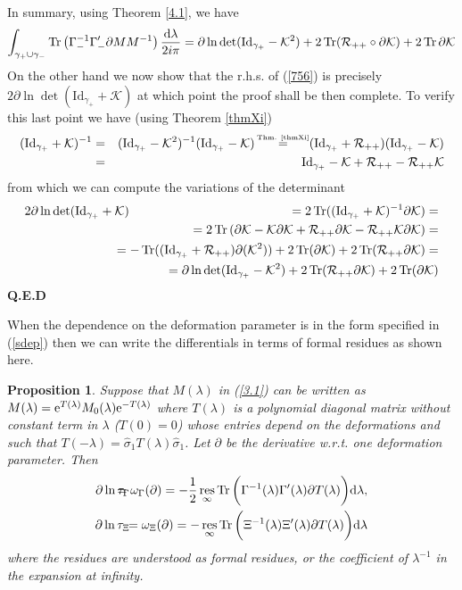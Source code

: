 \documentclass{article}
\newtheorem{prop}{Proposition}[section]
\def\s{\sigma}
\def\&{&\hspace{-20pt}}
\def\d{{\rm d}}
\def\wh{\widehat}
\def \pa{\partial}
\def\bea{\begin{eqnarray}}
\def\eea{\end{eqnarray}}
\def\Id{\mathrm{Id}}
\def\res{\mathop{{\rm res}}}
\def\Tr{\mathop{{\rm Tr}}}
\def\QED{ {\bf Q.E.D}\par \vskip 4pt}
\newcommand{\be}{\begin{eqnarray}}
\newcommand{\ee}{\end{eqnarray}}
\def\le{\left}
\def\ri{\right}
\begin{document}
In summary, using Theorem \ref{4.1}, we have
\be
\int_{\gamma_+  \cup \gamma_-} \Tr \le(\Gamma_{-}^{-1} \Gamma_-' \pa M M^{-1}\ri) \frac {\d \lambda}{2i\pi}  = 
\pa \ln \det( \Id_{\gamma_+} - \mathcal K^2)+
  2 \Tr (\mathcal R_{++} \circ \pa \mathcal K) 
+
 2 \Tr \pa \mathcal K
\label{756} 
\ee
On the other hand we now show that the r.h.s. of (\ref{756}) is precisely $2\pa \ln \det (\Id_{\gamma_+}
+
\mathcal K)$ at which point the proof shall be then complete.
To verify this last point  we have (using Theorem \ref{thmXi})
\bea
(\Id_{\gamma_+} 
 + 
 \mathcal K)^{-1} &=& (\Id_{\gamma_+}-\mathcal K^2)^{-1}(\Id_{\gamma_+}
  - 
 \mathcal K)
 \mathop{=}^{\hbox{\tiny Thm. \ref{thmXi}}} (\Id_{\gamma_+}  +\mathcal R_{++})(\Id_{\gamma_+}
  - 
 \mathcal K) \nonumber\\
&=&\Id_{\gamma_+} 
 - 
 \mathcal K + \mathcal R_{++} 
 - 
 \mathcal R_{++} \mathcal K \label{resolventformula}
\eea
from which we can compute the variations of the determinant
\bea
2\pa \ln \det (\Id_{\gamma_+} 
 + 
 \mathcal K) &\& =
 2
  \Tr ( (\Id_{\gamma_+} 
  + 
  \mathcal K)^{-1} \pa \mathcal K)=\nonumber\\
&\& =
2\Tr \le(
\pa \mathcal K  - \mathcal K \pa \mathcal K +  \mathcal R_{++} \pa \mathcal K    - 
  \mathcal R_{++}  \mathcal K \pa \mathcal K
\ri) =\nonumber\\
&\&=- \Tr ((\Id_{\gamma_+} +\mathcal R_{++} )\pa (\mathcal K^2)) 
 + 
 2\Tr (\pa \mathcal K) 
  + 
 2 \Tr ( \mathcal R_{++}\pa \mathcal K)=\nonumber\\
&\& = \pa \ln \det (\Id_{\gamma_+} - \mathcal K^2) 
 + 
2 \Tr ( \mathcal R_{++}\pa \mathcal K)
+
2\Tr (\pa \mathcal K) 
\eea
\QED
 




When the dependence on the deformation parameter is in the form specified in (\ref{sdep}) then we can write the differentials in terms of formal residues as shown here.
\begin{prop}
\label{formalres}
Suppose that $M(\lambda)$ in (\ref{3.1}) can be written as  $M(\lambda) = {\rm e}^{T(\lambda)} M_0(\lambda) {\rm e}^{-T(\lambda)}$ where $T(\lambda)$ is a polynomial diagonal matrix without constant term in $\lambda$ ($T(0)=0$) whose entries depend on the deformations and such that $T(-\lambda) = \wh \s_1 T(\lambda) \wh \s_1$. Let $\pa$ be the derivative w.r.t. one deformation parameter.   
Then 
\be
\pa \ln \tau_\Gamma &\& = \omega_\Gamma(\pa) =-\frac 12 \res_{\infty} \Tr\bigg(\Gamma^{-1}(\lambda)\Gamma'(\lambda) \pa T(\lambda)\bigg)\d \lambda ,\label{428}\\
\pa\ln \tau_\Xi &\&=  
\omega_\Xi(\pa) =- \res_{\infty} \Tr\bigg(\Xi^{-1}(\lambda)\Xi'(\lambda) \pa T(\lambda)\bigg)\d \lambda
\label{429}
\ee
where the residues are understood as formal residues, or the coefficient of $\lambda^{-1}$ in the expansion at infinity.
\end{prop}
\end{document}
